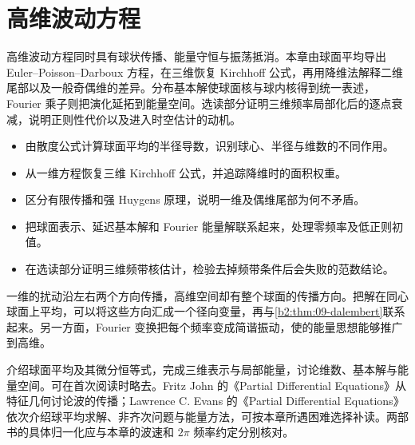 \chapter{高维波动方程}
\label{b2:ch:11}
\begin{chapterabstract}
高维波动方程同时具有球状传播、能量守恒与振荡抵消。本章由球面平均导出 Euler--Poisson--Darboux 方程，在三维恢复 Kirchhoff 公式，再用降维法解释二维尾部以及一般奇偶维的差异。分布基本解使球面核与球内核得到统一表述，Fourier 乘子则把演化延拓到能量空间。选读部分证明三维频率局部化后的逐点衰减，说明正则性代价以及进入时空估计的动机。
\end{chapterabstract}
\begin{learninggoals}
\begin{itemize}
\item\label{b2:item:11-goal-mean}由散度公式计算球面平均的半径导数，识别球心、半径与维数的不同作用。
\item\label{b2:item:11-goal-representation}从一维方程恢复三维 Kirchhoff 公式，并追踪降维时的面积权重。
\item\label{b2:item:11-goal-support}区分有限传播和强 Huygens 原理，说明一维及偶维尾部为何不矛盾。
\item\label{b2:item:11-goal-energy}把球面表示、延迟基本解和 Fourier 能量解联系起来，处理零频率及低正则初值。
\item\label{b2:item:11-goal-dispersion}在选读部分证明三维频带核估计，检验去掉频带条件后会失败的范数结论。
\end{itemize}
\end{learninggoals}

一维的扰动沿左右两个方向传播，高维空间却有整个球面的传播方向。把解在同心球面上平均，可以将这些方向汇成一个径向变量，再与\cref{b2:thm:09-dalembert}联系起来。另一方面，Fourier 变换把每个频率变成简谐振动，使的能量思想能够推广到高维。

\ProseParagraphBreak

介绍球面平均及其微分恒等式，完成三维表示与局部能量，讨论维数、基本解与能量空间。可在首次阅读时略去。Fritz John 的《Partial Differential Equations》\cite{John1991Partial}从特征几何讨论波的传播；Lawrence C. Evans 的《Partial Differential Equations》\cite[Sections 2.4.1--2.4.3]{Evans2010Partial}依次介绍球平均求解、非齐次问题与能量方法，可按本章所遇困难选择补读。两部书的具体归一化应与本章的波速和 \(2\pi\) 频率约定分别核对。






